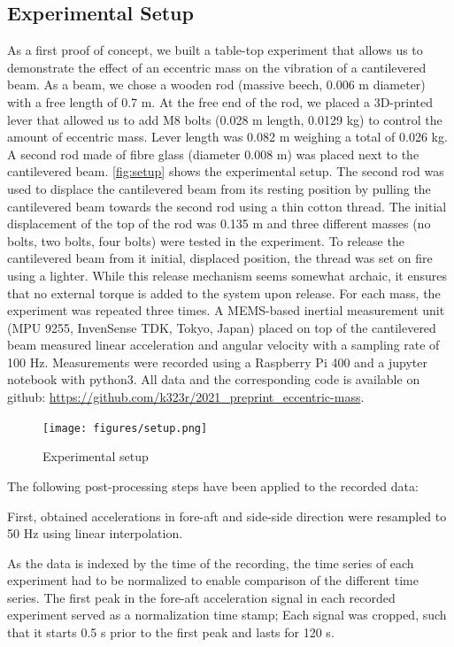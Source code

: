 \documentclass{article}
\begin{document}
\subsection{Experimental Setup}

As a first proof of concept, we built a table-top experiment that allows us to demonstrate the effect of an eccentric mass on the vibration of a cantilevered beam. As a beam, we chose a wooden rod (massive beech, 0.006 m diameter) with a free length of 0.7 m. At the free end of the rod, we placed a 3D-printed lever that allowed us to add M8 bolts (0.028 m length, 0.0129 kg) to control the amount of eccentric mass. Lever length was 0.082 m weighing a total of 0.026 kg. A second rod made of fibre glass (diameter 0.008 m) was placed next to the cantilevered beam. \autoref{fig:setup} shows the experimental setup. The second rod was used to displace the cantilevered beam from its resting position  by pulling the cantilevered beam towards the second rod using a thin cotton thread. The initial displacement of the top of the rod was 0.135 m and three different masses (no bolts, two bolts, four bolts) were tested in the experiment. To release the cantilevered beam from it initial, displaced position, the thread was set on fire using a lighter. While this release mechanism seems somewhat archaic, it ensures that no external torque is added to the system upon release. For each mass, the experiment was repeated three times. A MEMS-based inertial measurement unit (MPU 9255, InvenSense TDK, Tokyo, Japan) placed on top of the cantilevered beam measured linear acceleration and angular velocity with a sampling rate of 100 Hz. Measurements were recorded using a Raspberry Pi 400 and a jupyter notebook with python3. All data and the corresponding code is available on github: \url{https://github.com/k323r/2021_preprint_eccentric-mass}.

\begin{figure}[ht!]
    \centering
    \texttt{[image: figures/setup.png]}
    \caption{Experimental setup}
    \label{fig:setup}
\end{figure}

The following post-processing steps have been applied to the recorded data:

First, obtained accelerations in fore-aft and side-side direction were resampled to 50 Hz using linear interpolation. 

As the data is indexed by the time of the recording, the time series of each experiment had to be normalized to enable comparison of the different time series. The first peak in the fore-aft acceleration signal in each recorded experiment served as a normalization time stamp; Each signal was cropped, such that it starts 0.5 s prior to the first peak and lasts for 120 s. 
\end{document}
